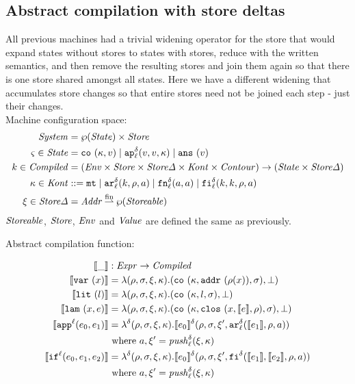 \documentclass{llncs}
\newcommand{\finto}{\mathbin{\overset{\text{fin}}{\rightharpoonup}}}
\newcommand{\alt}{\mid}
\begin{document}
\subsection{Abstract compilation with store deltas}

All previous machines had a trivial widening operator for the store
that would expand states without stores to states with stores, reduce
with the written semantics, and then remove the resulting stores and
join them again so that there is one store shared amongst all
states. Here we have a different widening that accumulates store
changes so that entire stores need not be joined each step - just
their changes.
\\
Machine configuration space:
\begin{align*}
\System &= \wp(\State) \times \Store \\
\mstate \in \State &= \co{\mkont, \mval} \alt
                     \ap[_\mlab^\mcntr]{\mval,\mval,\mkont} \alt
                     \ans{\mval} \\
\mcomp \in \Compiled &=
  (\Env \times \Store \times \StoreDelta \times \Kont \times \Counter) \to
   (\State \times \StoreDelta) \\
\mkont \in \Kont &::= \kmt \alt
                      \kar[_\mlab^\mcntr]{\mcomp, \menv, \maddr} \alt
                      \kfn[_\mlab^\mcntr]{\maddr, \maddr} \alt
                      \kif[_\mlab^\mcntr]{\mcomp, \mcomp, \menv, \maddr} \\
\msdiff \in \StoreDelta &= \Addr \finto \wp(\Storeable) \\
\end{align*}
$\Storeable$, $\Store$, $\Env$ and $\Value$ are defined the same as previously.

Abstract compilation function:

\begin{align*}
\compile{\_} &: \Expr \to \Compiled \\
\compile{\svar\mvar} &= \lambda(\menv,\msto,\msdiff, \mkont) .\ttuple{\co{\mkont,\saddr{\menv(\mvar)},\msto}}{\bot}
\\
\compile{\slit\mlit} &= \lambda(\menv,\msto,\msdiff,\mkont) .
\ttuple{\co{\mkont,\mlit,\msto}}{\bot}
\\
\compile{\slam\mvar\mexp} &= \lambda(\menv,\msto,\msdiff,\mkont) .
\ttuple{\co{\mkont,\clos{\mvar,\compile\mexp,\menv},\msto}}{\bot}
\\
\compile{\sapp[^\mlab]{\mexpi0}{\mexpi1}} &= \lambda^\mcntr (\menv,\msto,\msdiff,\mkont) .
\compile{\mexpi0}^\mcntr(\menv,\msto,\msdiff',\kar[_\mlab^\mcntr]{\compile{\mexpi1},\menv,\maddr})
\\
&
\text{ where }\maddr,\msdiff' = \push^\mcntr_\mlab(\msdiff,\mkont)
\\
\compile{\sif[^\mlab]{\mexpi0}{\mexpi1}{\mexpi2}} &= \lambda^\mcntr(\menv,\msto,\msdiff,\mkont) .
\compile{\mexpi0}^\delta(\menv,\msto,\msdiff',\kif[^\mcntr]{\compile{\mexpi1},\compile{\mexpi2},\menv,\maddr})
\\
&\text{ where }\maddr,\msdiff' = \push_\mlab^\mcntr(\msdiff,\mkont)
\end{align*}
\end{document}
